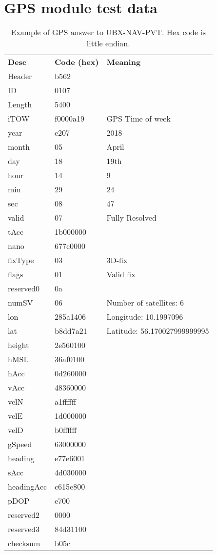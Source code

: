 \appendix
\setlength{\beforechapskip}{-15ex}

\chapter{GPS module test data}
\label{app:GPSmodtest}
\begin{table}[H]
	\centering
	\setlength{\extrarowheight}{0pt}
	\begin{tabularx}{0.8\textwidth}{p{2cm} p{2cm} X}
		\oldtoprule
		\textbf{Desc} & \textbf{Code (hex)} & \textbf{Meaning} \\
		\oldmidrule
		Header & b562 & \\
		ID & 0107 & \\
		Length & 5400 & \\
		iTOW & f0000a19 & GPS Time of week \\
		year & e207 & 2018 \\
		month & 05 & April \\
		day & 18 & 19th \\
		hour & 14 & 9 \\
		min & 29 & 24 \\
		sec & 08 & 47 \\
		valid & 07 & Fully Resolved \\
		tAcc & 1b000000 & \\
		nano & 677c0000 & \\
		fixType & 03 & 3D-fix \\
		flags & 01 & Valid fix \\
		reserved0 & 0a & \\
		numSV & 06 & Number of satellites: 6 \\
		lon & 285a1406 & Longitude: \num{10.1997096} \\
		lat & b8dd7a21 & Latitude: \num{56.170027999999995} \\
		height & 2e560100 & \\
		hMSL & 36af0100 & \\
		hAcc & 0d260000 & \\
		vAcc & 48360000 & \\
		velN & a1ffffff & \\
		velE & 1d000000 & \\
		velD & b0ffffff & \\
		gSpeed & 63000000 & \\
		heading & e77e6001 & \\
		sAcc & 4d030000 & \\
		headingAcc & c615e800 & \\
		pDOP & e700 & \\
		reserved2 & 0000 & \\
		reserved3 & 84d31100 & \\
		checksum & b05c & \\
		\bottomrule
	\end{tabularx}
	\caption{Example of GPS answer to UBX-NAV-PVT\cite[p.~160-161]{NEO7_proto}. Hex code is little endian.}
	\label{tab:GPSmoddata}
\end{table}

